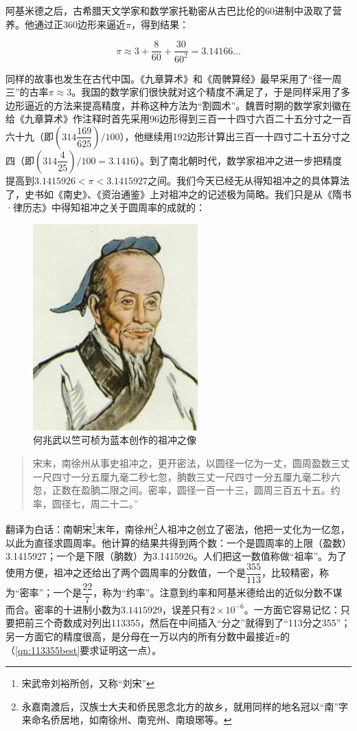 \documentclass[b5paper]{ctexart}
\begin{document}
阿基米德之后，古希腊天文学家和数学家托勒密从古巴比伦的60进制中汲取了营养。他通过正360边形来逼近$\pi$，得到结果：

\[
\pi \approx 3 + \frac{8}{60} + \frac{30}{60^2} = 3.14166\dotso
\]

同样的故事也发生在古代中国。《九章算术》和《周髀算经》最早采用了“径一周三”的古率$\pi \approx 3$。我国的数学家们很快就对这个精度不满足了，于是同样采用了多边形逼近的方法来提高精度，并称这种方法为“割圆术”。魏晋时期的数学家刘徽在给《九章算术》作注释时首先采用96边形得到三百一十四寸六百二十五分寸之一百六十九（即$(314\dfrac{169}{625})/100$），他继续用192边形计算出三百一十四寸二十五分寸之四（即$(314\dfrac{4}{25})/100 = 3.1416$）。到了南北朝时代，数学家祖冲之进一步把精度提高到$3.1415926 < \pi < 3.1415927$之间。我们今天已经无从得知祖冲之的具体算法了，史书如《南史》、《资治通鉴》上对祖冲之的记述极为简略。我们只是从《隋书·律历志》中得知祖冲之关于圆周率的成就的：

\begin{figure}[htbp]
 \centering
 \includegraphics[scale=0.5]{img/zuchongzhi}
 \caption{何兆武以竺可桢为蓝本创作的祖冲之像}
 \label{fig:zuchongzhi}
\end{figure}

\begin{quotation}
宋末，南徐州从事史祖冲之，更开密法，以圆径一亿为一丈，圆周盈数三丈一尺四寸一分五厘九毫二秒七忽，朒数三丈一尺四寸一分五厘九毫二秒六忽，正数在盈朒二限之间。密率，圆径一百一十三，圆周三百五十五。约率，圆径七，周二十二。”
\end{quotation}

翻译为白话：南朝宋\footnote{宋武帝刘裕所创，又称“刘宋”}末年，南徐州\footnote{永嘉南渡后，汉族士大夫和侨民思念北方的故乡，就用同样的地名冠以“南”字来命名侨居地，如南徐州、南兖州、南琅琊等。}人祖冲之创立了密法，他把一丈化为一亿忽，以此为直径求圆周率。他计算的结果共得到两个数：一个是圆周率的上限（盈数）3.1415927；一个是下限（朒数）为3.1415926。人们把这一数值称做“祖率”。为了使用方便，祖冲之还给出了两个圆周率的分数值，一个是$\dfrac{355}{113}$，比较精密，称为“密率”；一个是$\dfrac{22}{7}$，称为“约率”。注意到约率和阿基米德给出的近似分数不谋而合。密率的十进制小数为$3.1415929$，误差只有$2 \times 10^{-6}$。一方面它容易记忆：只要把前三个奇数成对列出113355，然后在中间插入“分之”就得到了“113分之355”；另一方面它的精度很高，是分母在一万以内的所有分数中最接近$\pi$的（\cref{qn:113355best}要求证明这一点）。
\end{document}
